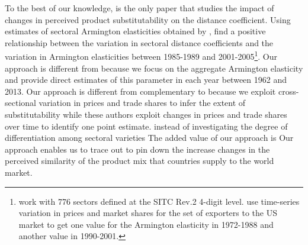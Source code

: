 \documentclass[12pt,twoside,a4paper,notitlepage]{article}
\begin{document}
To the best of our knowledge, \cite{Berthelon2008} is the only paper that studies the impact of changes in perceived product substitutability on the distance coefficient. Using estimates of sectoral Armington elasticities obtained by \cite{Broda2006}, \cite{Berthelon2008} find a positive relationship between the variation in sectoral distance coefficients and the variation in Armington elasticities between 1985-1989 and 2001-2005\footnote{\cite{Berthelon2008} work with 776 sectors defined at the SITC Rev.2 4-digit level. \cite{Broda2006} use time-series variation in prices and market shares for the set of exporters to the US market to get one value for the Armington elasticity in 1972-1988 and another value in 1990-2001.}. 
Our approach is different from \cite{Berthelon2008} because we focus on the aggregate Armington elasticity and provide direct estimates of this parameter in each year between 1962 and 2013. Our approach is different from  complementary to\fi \cite{Broda2006} because we exploit cross-sectional variation in prices and trade shares to infer the extent of substitutability while these authors exploit changes in prices and trade shares over time to identify one point estimate.  instead of investigating the degree of differentiation among sectoral varieties The added value of our approach is \fi Our approach enables us to trace out  to pin down the increase \fi changes in the perceived similarity of the product mix that countries supply to the world market.
\end{document}
